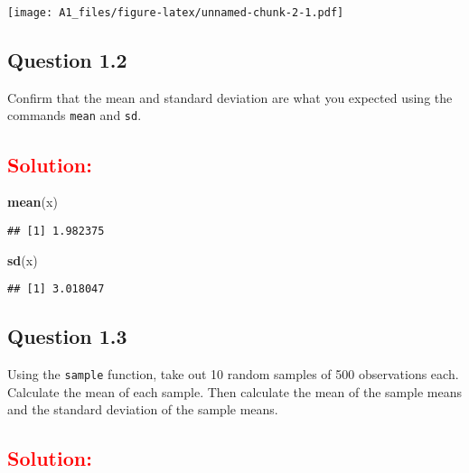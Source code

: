 \documentclass[]{article}
\newenvironment{Shaded}{\begin{snugshade}}{\end{snugshade}}
\newcommand{\KeywordTok}[1]{\textcolor[rgb]{0.13,0.29,0.53}{\textbf{#1}}}
\newcommand{\NormalTok}[1]{#1}
\begin{document}
\texttt{[image: A1\_files/figure-latex/unnamed-chunk-2-1.pdf]}

\subsection{Question 1.2}\label{question-1.2}

Confirm that the mean and standard deviation are what you expected using
the commands \texttt{mean} and \texttt{sd}.

\subsection{\texorpdfstring{\textcolor{red}{Solution:}}{}}\label{section-2}

\begin{Shaded}
\begin{Highlighting}[]
\KeywordTok{mean}\NormalTok{(x)}
\end{Highlighting}
\end{Shaded}

\begin{verbatim}
## [1] 1.982375
\end{verbatim}

\begin{Shaded}
\begin{Highlighting}[]
\KeywordTok{sd}\NormalTok{(x)}
\end{Highlighting}
\end{Shaded}

\begin{verbatim}
## [1] 3.018047
\end{verbatim}

\subsection{Question 1.3}\label{question-1.3}

Using the \texttt{sample} function, take out 10 random samples of 500
observations each. Calculate the mean of each sample. Then calculate the
mean of the sample means and the standard deviation of the sample means.

\subsection{\texorpdfstring{\textcolor{red}{Solution:}}{}}\label{section-3}
\end{document}
